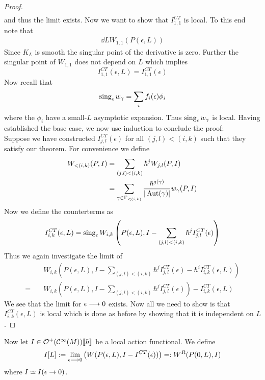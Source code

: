 \begin{theo}
\begin{proof}
\begin{align}
  \end{align}
  and thus the limit exists. Now we want to show that $I_{1,1}^{CT}$ is local. To this end note that
  \begin{align}
    \dd{}{L} W_{1,1}(P(\epsilon,L))
  \end{align}
  Since $K_L$ is smooth the singular point of the derivative is zero. Further the singular point of $W_{1,1}$ does not depend on $L$ which implies
  \begin{equation}I_{1,1}^{CT}(\epsilon, L) = I_{1,1}^{CT}(\epsilon)\end{equation}
  Now recall that
  \begin{equation}\sing_\epsilon w_\gamma = \sum_i f_i(\epsilon) \phi_i\end{equation}
  where the $\phi_i$ have a small-$L$ asymptotic expansion. Thus $\sing_\epsilon w_\gamma$ is local. Having established the base case, we now use induction to conclude the proof:\\
  Suppose we have constructed $I_{j,l}^{CT}(\epsilon)$ for all $(j,l)<(i,k)$ such that they satisfy our theorem. For convenience we define
  \begin{align}
    W_{<(i,k)} (P,I) &= \sum_{(j,l)<(i,k)} \hbar^j W_{j,l}(P,I)\\
    &= \sum_{\gamma \in \Gamma_{<(i,k)}} \frac{\hbar^{g(\gamma)}}{|\operatorname{Aut}(\gamma)|} w_\gamma (P,I)
  \end{align}
  Now we define the counterterms as
  \begin{equation}I_{i,k}^{CT}(\epsilon, L) = \sing_\epsilon W_{i,k}\left(P(\epsilon,L), I - \sum_{(j,l)<(i,k)}\hbar^j I_{j,l}^{CT}(\epsilon)\right)\end{equation}
  Thus we again investigate the limit of
  \begin{align}
    &W_{i,k}\left( P(\epsilon,L), I - \sum_{(j,l)<(i,k)}\hbar^j I_{j,l}^{CT}(\epsilon) - \hbar^i I_{i,k}^{CT}(\epsilon, L) \right)\\
    = \quad &W_{i,k}\left( P(\epsilon,L), I - \sum_{(j,l)<(i,k)}\hbar^j I_{j,l}^{CT}(\epsilon) \right) - I_{i,k}^{CT}(\epsilon, L)
  \end{align}
  We see that the limit for $\epsilon \lra 0$ exists. Now all we need to show is that $I_{i,k}^{CT}(\epsilon,L)$ is local which is done as before by showing that it is independent on $L$.
\end{proof}
\end{theo}

Now let $I \in \mathcal{O}^+(\mathcal{C}^{\infty}(M))\llbracket\hbar\rrbracket$ be a local action functional. We define
\begin{equation} I[L] := \lim_{\epsilon \lra 0} \left( W(P(\epsilon,L), I - I^{CT}(\epsilon)) \right) =: W^R(P(0,L), I)\end{equation}
where $I \simeq I(\epsilon \ra 0) $.

